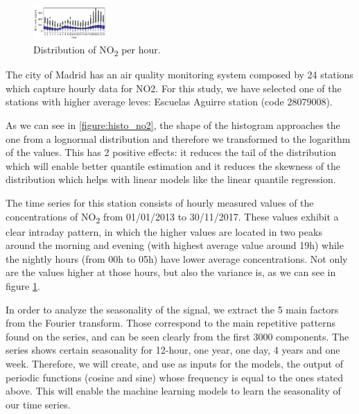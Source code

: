 \documentclass[a4paper,twocolumn,5p]{elsarticle}
\begin{document}
\begin{figure}
  \centering
  \includegraphics[width=0.25\textwidth]{NO2Var}
  \caption{\label{figure:variance}Distribution of NO\textsubscript{2}
    per hour.}
\end{figure}

The city of Madrid has an air quality monitoring system composed by 24
stations which capture hourly data for NO2.  %
For this study, we have selected one of
the stations with higher average leves: Escuelas Aguirre station (code
28079008).

As we can see in \ref{figure:histo_no2}, the shape of the histogram
approaches the one from a lognormal distribution and therefore we
transformed to the logarithm of the values. This has 2 positive
effects: it reduces the tail of the distribution which will enable
better quantile estimation and it reduces the skewness of the
distribution which helps with linear models like the linear quantile
regression.

The time series for this station consists of hourly measured values of
the concentrations of NO\textsubscript{2} from 01/01/2013 to
30/11/2017. These values exhibit a clear intraday pattern, in which
the higher values are located in two peaks around the morning and
evening (with highest average value around 19h) while the nightly
hours (from 00h to 05h) have lower average concentrations.  Not only
are the values higher at those hours, but also the variance is, as we
can see in figure \ref{figure:variance}.
 
In order to analyze the seasonality of the signal, we extract the 5
main factors from the Fourier transform. Those correspond to the main
repetitive patterns found on the series, and can be seen clearly from
the first 3000 components. The series shows certain seasonality for
12-hour, one year, one day, 4 years and one week.  Therefore, we will
create, and use as inputs for the models, the output of periodic
functions (cosine and sine) whose frequency is equal to the ones
stated above. This will enable the machine learning models to learn
the seasonality of our time series.
\end{document}

